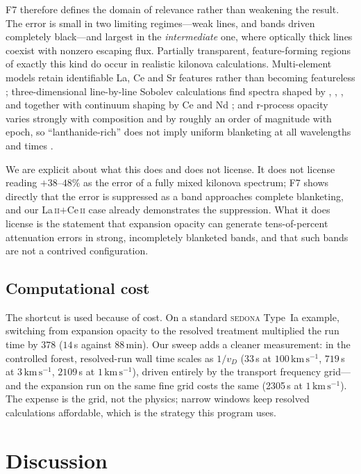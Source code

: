 \documentclass[fleqn,usenatbib]{mnras}
\newcommand{\kms}{\,\mathrm{km\,s^{-1}}}
\begin{document}
F7 therefore defines the domain of relevance rather than weakening the
result. The error is small in two limiting regimes---weak lines, and bands
driven completely black---and largest in the \emph{intermediate} one, where
optically thick lines coexist with nonzero escaping flux. Partially
transparent, feature-forming regions of exactly this kind do occur in
realistic kilonova calculations. Multi-element models retain identifiable
La, Ce and Sr features rather than becoming featureless
\citep{domoto2022,gillanders2022}; three-dimensional line-by-line Sobolev
calculations find spectra shaped by , ,
,  and  together with continuum
shaping by Ce and Nd \citep{shingles2023,collins2023,collins2026}; and
r-process opacity varies strongly with composition and by roughly an order
of magnitude with epoch, so ``lanthanide-rich'' does not imply uniform
blanketing at all wavelengths and times \citep{tanaka2020}.

We are explicit about what this does and does not license. It does not
license reading $+38$--$48\%$ as the error of a fully mixed kilonova
spectrum; F7 shows directly that the error is suppressed as a band
approaches complete blanketing, and our La\,\textsc{ii}$+$Ce\,\textsc{ii}
case already demonstrates the suppression. What it does license is the
statement that expansion opacity can generate tens-of-percent attenuation
errors in strong, incompletely blanketed bands, and that such bands are not
a contrived configuration.

\subsection{Computational cost}
\label{sec:cost}

The shortcut is used because of cost. On a standard \textsc{sedona}
Type~Ia example, switching from expansion opacity to the resolved treatment
multiplied the run time by $378$ ($14$\,s against $88$\,min). Our sweep adds
a cleaner measurement: in the controlled forest, resolved-run wall time scales
as $1/v_D$ ($33\,$s at $100\kms$, $719\,$s at $3\kms$, $2109\,$s at $1\kms$),
driven entirely by the transport frequency grid---and the expansion run on
the same fine grid costs the same (2305\,s at $1\kms$). The expense is the
grid, not the physics; narrow windows keep resolved calculations
affordable, which is the strategy this program uses.

\section{Discussion}
\label{sec:discussion}
\end{document}
